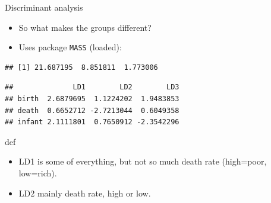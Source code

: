 \documentclass[ignorenonframetext,]{beamer}
\newenvironment{Shaded}{\begin{snugshade}}{\end{snugshade}}
\newcommand{\DataTypeTok}[1]{\textcolor[rgb]{0.13,0.29,0.53}{#1}}
\newcommand{\KeywordTok}[1]{\textcolor[rgb]{0.13,0.29,0.53}{\textbf{#1}}}
\newcommand{\NormalTok}[1]{#1}
\newcommand{\OperatorTok}[1]{\textcolor[rgb]{0.81,0.36,0.00}{\textbf{#1}}}
\newcommand{\StringTok}[1]{\textcolor[rgb]{0.31,0.60,0.02}{#1}}
\begin{document}
\begin{frame}[fragile]{Discriminant analysis}
\protect\hypertarget{discriminant-analysis-3}{}

\begin{itemize}
\item
  So what makes the groups different?
\item
  Uses package \texttt{MASS} (loaded):
\end{itemize}

\begin{Shaded}
\end{Shaded}

\begin{verbatim}
## [1] 21.687195  8.851811  1.773006
\end{verbatim}

\begin{Shaded}
\end{Shaded}

\begin{verbatim}
##              LD1        LD2        LD3
## birth  2.6879695  1.1224202  1.9483853
## death  0.6652712 -2.7213044  0.6049358
## infant 2.1111801  0.7650912 -2.3542296
\end{verbatim}

def

\begin{itemize}
\item
  LD1 is some of everything, but not so much death rate (high=poor,
  low=rich).
\item
  LD2 mainly death rate, high or low.
\end{itemize}

\end{frame}
\end{document}

